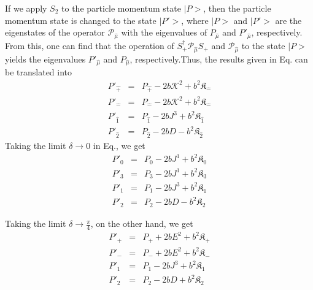 \documentclass[]{article}
\numberwithin{equation}{section}
\def\bea{\begin{eqnarray}}
\def\eea{\end{eqnarray}}
\def\wh{\widehat}
\begin{document}
{{If we apply $S_2$ to the particle momentum state $|P>$, then the particle momentum state is changed to
the state $|P'>$, where $|P>$ and $|P'>$ are the eigenstates of the operator 
${\mathcal P}_{\wh{\mu}}$ with the eigenvalues of  $P_{\wh{\mu}}$ 
and $P'_{\wh{\mu}}$, respectively. From this, one can find that the operation of 
$S_+^{\dagger} {\mathcal P}_{\wh{\mu}}S_+$ and ${\mathcal P}_{\wh{\mu}}$ to the state $|P>$ yields the eigenvalues 
$P'_{\wh{\mu}}$ and $P_{\wh{\mu}}$, respectively.Thus, the results given in Eq. can be translated into
\bea
P'_{\wh+} & = & P_{\wh+}-2b\mathcal{K}^2+{b^2}\mathfrak{K}_\hat{-}
\nonumber\\ 
P'_{\wh-} & = & P_{\wh-} -2b\mathcal{K}^2+{b^2}\mathfrak{K}_{\hat{-}}
\nonumber\\
P'_{\wh{1}} & = & {P}_{\wh{1}}-2bJ^3+b^2\mathfrak{K}_{\hat{1}} \nonumber\\
P'_{\wh{2}} & = & {P}_{\wh{2}}-2bD-b^2\mathfrak{K}_{\hat{2}}
\eea
%
Taking the limit $\delta \rightarrow 0$ in Eq., we get
\bea
P'_{0} & = & P_{0}-2bJ^1+{b^2}\mathfrak{K}_{0}
\nonumber\\ 
P'_{3} & = & P_{3}-2bJ^1+{b^2}\mathfrak{K}_{3}
\nonumber\\
P'_{{1}} & = & {P}_{{1}}-2bJ^3+b^2\mathfrak{K}_{{1}} \nonumber\\
P'_{{2}} & = & {P}_{{2}}-2bD-b^2\mathfrak{K}_{{2}}
\eea

Taking the limit $\delta \rightarrow \frac{\pi}{4}$, on the other hand, we get
\bea
P'_{+} & = & P_{+}+2bE^2+{b^2}\mathfrak{K}_{{+}}
\nonumber\\ 
P'_{-} & = & P_{-}+2bE^2+{b^2}\mathfrak{K}_{{-}}
\nonumber\\
P'_{{1}} & = & {P}_{{1}}-2bJ^3+b^2\mathfrak{K}_{{1}} \nonumber\\
P'_{{2}} & = & {P}_{{2}}-2bD+b^2\mathfrak{K}_{{2}}
\eea

}}
\end{document}
